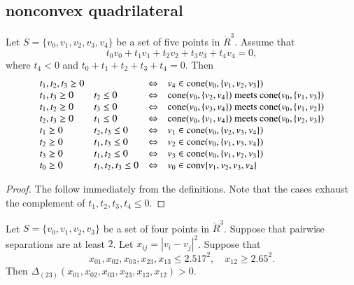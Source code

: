 \newpage




\subsection{nonconvex quadrilateral}

\begin{lemma}
Let $S=\{v_0,v_1,v_2,v_3,v_4\}$ be a set of five points in
$\ring{R}^3$.
Assume that
   $$
   t_0 v_0 + t_1 v_1 + t_2 v_2 + t_3 v_3 + t_4 v_4 = 0,
   $$
where $t_4 < 0$ and $t_0+t_1+t_2+t_3+t_4=0$.
Then
   $$
   \def\lr{\Leftrightarrow}
   \def\m{ \text{ meets } }
   \def\cc{\op{cone}}
   \begin{array}{llcl}
  t_1,t_2,t_3\ge 0  &      &\lr& v_4\in\cc(v_0,\{v_1,v_2,v_3\})\\
  t_1,t_3\ge 0 & t_2\le 0  &\lr& \cc(v_0,\{v_2,v_4\})\m\cc(v_0,\{v_1,v_3\})\\
  t_1,t_2\ge 0 & t_3\le 0  &\lr& \cc(v_0,\{v_3,v_4\})\m\cc(v_0,\{v_1,v_2\})\\
  t_2,t_3\ge 0 & t_1\le 0  &\lr& \cc(v_0,\{v_1,v_4\})\m\cc(v_0,\{v_2,v_3\})\\
  t_1\ge0     & t_2,t_3\le0&\lr& v_1\in\cc(v_0,\{v_2,v_3,v_4\})\\
  t_2\ge0     & t_1,t_3\le0&\lr& v_2\in\cc(v_0,\{v_1,v_3,v_4\})\\
  t_3\ge0     & t_1,t_2\le0&\lr& v_3\in\cc(v_0,\{v_1,v_2,v_3\})\\
  t_0\ge0  &t_1,t_2,t_3\le0&\lr& v_0\in\op{conv}\{v_1,v_2,v_3,v_4\}\\
   \end{array}
   $$
\end{lemma}

\begin{proof}
The follow immediately from the definitions.
Note that the cases exhaust the complement of $t_1,t_2,t_3,t_4\le 0$.
\end{proof}

\newpage




\begin{lemma}
Let $S=\{v_0,v_1,v_2,v_3\}$ be a set of four
points in $\ring{R}^3$.  Suppose that pairwise separations
are at least $2$. 
Let $x_{ij}=|v_i-v_j|^2$.
 Suppose that
$$
x_{01},x_{02},x_{03},x_{23},x_{13}\le 2.517^2,\quad x_{12}\ge 2.65^2.
$$
Then $\Delta_{(23)}(x_{01},x_{02},x_{03},x_{23},x_{13},x_{12})>0$.
\end{lemma}


